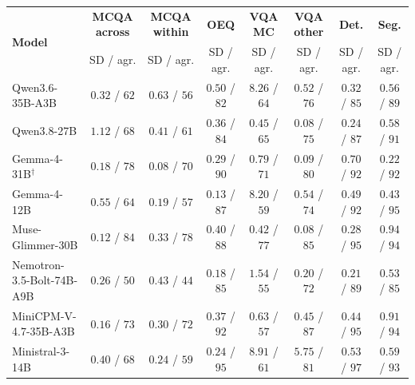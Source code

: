 \begin{tabular}{lccccccc}
\toprule
\multirow{2}{*}{\textbf{Model}} & \textbf{MCQA across} & \textbf{MCQA within} & \textbf{OEQ} & \textbf{VQA MC} & \textbf{VQA other} & \textbf{Det.} & \textbf{Seg.} \\
 & SD / agr. & SD / agr. & SD / agr. & SD / agr. & SD / agr. & SD / agr. & SD / agr. \\
\midrule
Qwen3.6-35B-A3B & $0.32$ / $62$ & $0.63$ / $56$ & $0.50$ / $82$ & $8.26$ / $64$ & $0.52$ / $76$ & $0.32$ / $85$ & $0.56$ / $89$ \\
Qwen3.8-27B & $1.12$ / $68$ & $0.41$ / $61$ & $0.36$ / $84$ & $0.45$ / $65$ & $0.08$ / $75$ & $0.24$ / $87$ & $0.58$ / $91$ \\
Gemma-4-31B$^\dagger$ & $0.18$ / $78$ & $0.08$ / $70$ & $0.29$ / $90$ & $0.79$ / $71$ & $0.09$ / $80$ & $0.70$ / $92$ & $0.22$ / $92$ \\
Gemma-4-12B & $0.55$ / $64$ & $0.19$ / $57$ & $0.13$ / $87$ & $8.20$ / $59$ & $0.54$ / $74$ & $0.49$ / $92$ & $0.43$ / $95$ \\
Muse-Glimmer-30B & $0.12$ / $84$ & $0.33$ / $78$ & $0.40$ / $88$ & $0.42$ / $77$ & $0.08$ / $85$ & $0.28$ / $95$ & $0.94$ / $94$ \\
Nemotron-3.5-Bolt-74B-A9B & $0.26$ / $50$ & $0.43$ / $44$ & $0.18$ / $85$ & $1.54$ / $55$ & $0.20$ / $72$ & $0.21$ / $89$ & $0.53$ / $85$ \\
MiniCPM-V-4.7-35B-A3B & $0.16$ / $73$ & $0.30$ / $72$ & $0.37$ / $92$ & $0.63$ / $57$ & $0.45$ / $87$ & $0.44$ / $95$ & $0.91$ / $94$ \\
Ministral-3-14B & $0.40$ / $68$ & $0.24$ / $59$ & $0.24$ / $95$ & $8.91$ / $61$ & $5.75$ / $81$ & $0.53$ / $97$ & $0.59$ / $93$ \\
\bottomrule
\end{tabular}
